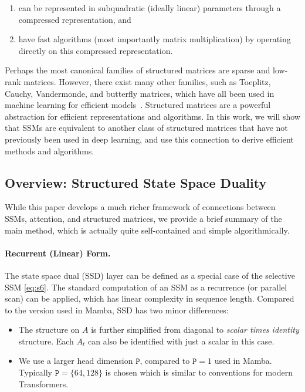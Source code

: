 \begin{enumerate}[label=(\roman*)]
  \item can be represented in subquadratic (ideally linear) parameters through a compressed representation, and \item have fast algorithms (most importantly matrix multiplication) by operating directly on this compressed representation.
\end{enumerate}

Perhaps the most canonical families of structured matrices are sparse and low-rank matrices. However, there exist many other families, such as Toeplitz, Cauchy, Vandermonde, and butterfly matrices, which have all been used in machine learning for efficient models~\citep{thomas2018learning,dao2019learning,gu2022parameterization,fu2024monarch}.
Structured matrices are a powerful abstraction for efficient representations and algorithms. In this work, we will show that SSMs are equivalent to another class of structured matrices that have not previously been used in deep learning, and use this connection to derive efficient methods and algorithms.

\subsection{Overview: Structured State Space Duality}

While this paper develops a much richer framework of connections between SSMs, attention, and structured matrices, we provide a brief summary of the main method, which is actually quite self-contained and simple algorithmically.

\paragraph{Recurrent (Linear) Form.} The state space dual (SSD) layer can be defined as a special case of the selective SSM \eqref{eq:s6}.
The standard computation of an SSM as a recurrence (or parallel scan) can be applied, which has linear complexity in sequence length. Compared to the version used in Mamba, SSD has two minor differences:

\begin{itemize}
  \item The structure on $A$ is further simplified from diagonal to \emph{scalar times identity} structure. Each $A_t$ can also be identified with just a scalar in this case.
  \item We use a larger head dimension $\mathtt{P}$, compared to $\mathtt{P}=1$ used in Mamba. Typically $\mathtt{P}=\{64,128\}$ is chosen which is similar to conventions for modern Transformers. 
\end{itemize}

